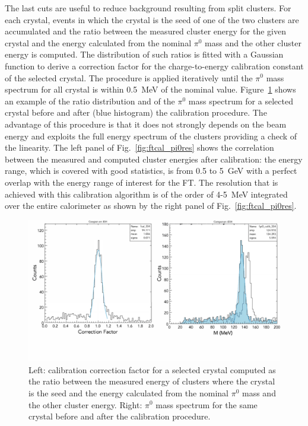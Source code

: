 The last cuts are useful to reduce background resulting from split clusters.  For each crystal, events in which the
crystal is the seed of one of the two clusters are accumulated and the ratio between the measured cluster energy
for the given crystal and the energy calculated from the nominal $\pi^0$ mass and the other cluster energy is
computed. The distribution of such ratios is fitted with a Gaussian function to derive a correction factor for the
charge-to-energy calibration constant of the selected crystal. The procedure is applied iteratively until the $\pi^0$
mass spectrum for all crystal is within 0.5~MeV of the nominal value. Figure~\ref{fig:ftcal_pi0} shows an example of
the ratio distribution and of the $\pi^0$ mass spectrum for a selected crystal before and after (blue histogram)
the calibration procedure. The advantage of this procedure is that it does not strongly depends on the beam energy
and exploits the full energy spectrum of the clusters providing a check of the linearity. The left panel of
Fig.~\ref{fig:ftcal_pi0res} shows the  correlation between the measured and computed cluster energies after
calibration: the energy range, which is covered with good statistics, is from 0.5 to 5~GeV with a perfect overlap with
the energy range of interest for the FT. The resolution that is achieved with this calibration algorithm is of the order
of 4-5~MeV integrated over the entire calorimeter as  shown by the right panel of Fig.~\ref{fig:ftcal_pi0res}.

\begin{figure}
\includegraphics[height=0.46\columnwidth]{fig/ftcal_pi0.pdf}
\caption{Left: calibration correction factor for a selected crystal computed as the ratio between the measured
  energy of clusters where the crystal is the seed and the energy calculated from the nominal $\pi^0$ mass and the
  other cluster energy. Right: $\pi^0$ mass spectrum for the same crystal before and after the calibration procedure.}
\label{fig:ftcal_pi0}
\end{figure}

